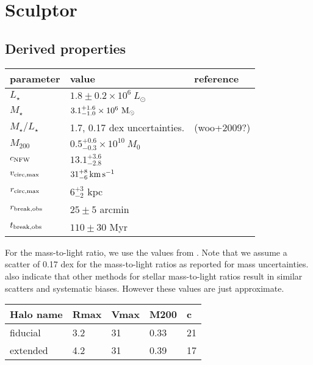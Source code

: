 \section{Sculptor}\label{sculptor}

\subsection{Derived properties}\label{derived-properties}

\begin{table*}[t]
\centering
\begin{tabular}{lll}
\toprule
parameter & value & reference\\
\midrule
$L_\star$ & $1.8\pm0.2\times10^6\ L_\odot$ & \\
$M_\star$ & $3.1_{-1.0}^{+1.6} \times10^6\ {\rm M}_\odot$ & \\
$M_\star / L_\star$ & 1.7, 0.17 dex uncertainties. & (woo+2009?)\\
$M_{200}$ & $0.5_{-0.3}^{+0.6} \times10^10\ M_0$ & \\
$c_{\rm NFW}$ & $13.1_{-2.8}^{+3.6}$ & \\
$v_{\rm circ, max}$ & $31_{-6}^{+8}\,{\rm km\,s^{-1}}$ & \\
$r_{\rm circ, max}$ & $6_{-2}^{+3}$ kpc & \\
$r_{\rm break, obs}$ & $25 \pm 5$ arcmin & \\
$t_{\rm break, obs}$ & $110\pm30$ Myr & \\
\bottomrule
\end{tabular}
\end{table*}

For the mass-to-light ratio, we use the values from \citet{woo+2009}.
Note that we assume a scatter of 0.17 dex for the mass-to-light ratios
as reported for mass uncertainties. \citet{delosreyes+2024} also
indicate that other methods for stellar mass-to-light ratios result in
similar scatters and systematic biases. However these values are just
approximate.

\begin{table*}[t]
\centering
\begin{tabular}{lllll}
\toprule
Halo name & Rmax & Vmax & M200 & c\\
\midrule
fiducial & 3.2 & 31 & 0.33 & 21\\
extended & 4.2 & 31 & 0.39 & 17\\
\bottomrule
\end{tabular}
\end{table*}

